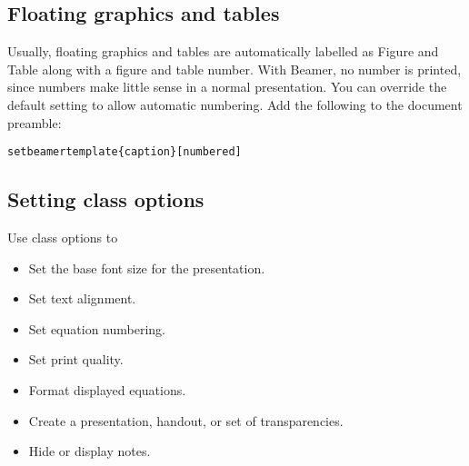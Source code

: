 \documentclass[notes=show,beamer]{beamer}
\begin{document}
\subsection{Floating graphics and tables}

\begin{frame}%


Usually, floating graphics and tables are automatically labelled as Figure
and Table along with a figure and table number. With Beamer, no number is
printed, since numbers make little sense in a normal presentation. You can
override the default setting to allow automatic numbering. Add the following
to the document preamble:

\texttt{\TEXTsymbol{\backslash}setbeamertemplate\{caption\}[numbered]}

\transboxout%
\end{frame}%

\subsection{Setting class options}

\begin{frame}%


Use class options to

\begin{itemize}
\item Set the base font size for the presentation.

\item Set text alignment.

\item Set equation numbering.

\item Set print quality.

\item Format displayed equations.

\item Create a presentation, handout, or set of transparencies.

\item Hide or display notes.
\end{itemize}

\transboxout%
\end{frame}%
\end{document}

